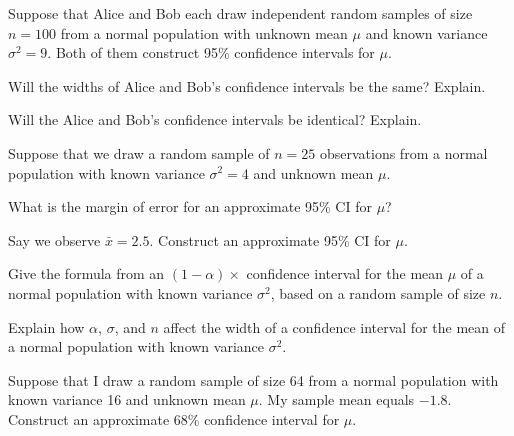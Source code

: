 \documentclass[addpoints,12pt]{exam}
\begin{document}
\begin{questions}

\question Suppose that Alice and Bob each draw independent random samples of size $n=100$ from a normal population with unknown mean $\mu$ and known variance $\sigma^2=9$. Both of them construct 95\% confidence intervals for $\mu$. 
\begin{parts}
  \item Will the widths of Alice and Bob's confidence intervals be the same? Explain. 
  \item Will the Alice and Bob's confidence intervals be identical? Explain.
\end{parts}

\question Suppose that we draw a random sample of $n = 25$ observations from a normal population with known variance $\sigma^2 = 4$ and unknown mean $\mu$. 
\begin{parts}
 \item What is the margin of error for an approximate 95\% CI for $\mu$?
 \item Say we observe $\bar{x} = 2.5$. Construct an approximate 95\% CI for $\mu$.
\end{parts}

\question Give the formula from an $(1 - \alpha)\times$ confidence interval for the mean $\mu$ of a normal population with known variance $\sigma^2$, based on a random sample of size $n$.

\question Explain how $\alpha$, $\sigma$, and $n$ affect the width of a confidence interval for the mean of a normal population with known variance $\sigma^2$.

\question Suppose that I draw a random sample of size 64 from a normal population with known variance 16 and unknown mean $\mu$. My sample mean equals $-1.8$. Construct an approximate 68\% confidence interval for $\mu$.



\end{questions}
\end{document}
